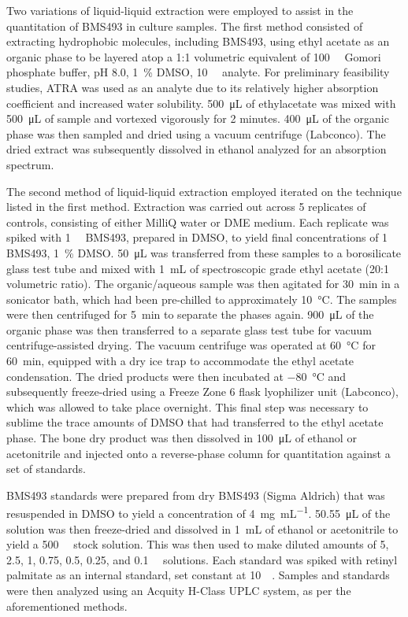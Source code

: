 \begin{refsection}
Two variations of liquid-liquid extraction were employed to assist in the
quantitation of BMS493 in culture samples. The first method consisted of
extracting hydrophobic molecules, including BMS493, using ethyl acetate as an
organic phase to be layered atop a 1:1 volumetric equivalent of
\SI{100}{\milli\moLar} Gomori phosphate buffer, pH 8.0, \SI{1}{\percent} DMSO,
\SI{10}{\micro\moLar} analyte. For preliminary feasibility studies, ATRA was
used as an analyte due to its relatively higher absorption coefficient and
increased water solubility. \SI{500}{\uL} of ethylacetate was mixed with
\SI{500}{\uL} of sample and vortexed vigorously for 2 minutes. \SI{400}{\uL} of
the organic phase was then sampled and dried using a vacuum centrifuge
(Labconco). The dried extract was subsequently dissolved in ethanol analyzed
for an absorption spectrum.

The second method of liquid-liquid extraction employed iterated on the technique
listed in the first method. Extraction was carried out across 5 replicates of
controls, consisting of either MilliQ water or DME medium. Each replicate was
spiked with \SI{1}{\milli\moLar} BMS493, prepared in DMSO, to yield final
concentrations of \SI{1}{\micro\moLar} BMS493, \SI{1}{\percent} DMSO.
\SI{50}{\uL} was transferred from these samples to a borosilicate glass test
tube and mixed with \SI{1}{\mL} of spectroscopic grade ethyl acetate (20:1
volumetric ratio). The organic/aqueous sample was then agitated for
\SI{30}{\minute} in a sonicator bath, which had been pre-chilled to
approximately \SI{10}{\celsius}. The samples were then centrifuged for
\SI{5}{\minute} to separate the phases again. \SI{900}{\uL} of the organic phase
was then transferred to a separate glass test tube for vacuum
centrifuge-assisted drying.  The vacuum centrifuge was operated at
\SI{60}{\celsius} for \SI{60}{\minute}, equipped with a dry ice trap to
accommodate the  ethyl acetate condensation. The dried products were then
incubated at \SI{-80}{\celsius} and subsequently freeze-dried using a Freeze
Zone 6 flask lyophilizer unit (Labconco), which was allowed to take place
overnight. This final step was necessary to sublime the trace amounts of DMSO
that had transferred to the ethyl acetate phase. The bone dry product was then
dissolved in \SI{100}{\uL} of ethanol or acetonitrile and injected onto a
 reverse-phase column for quantitation against a set of standards.

BMS493 standards were prepared from dry BMS493 (Sigma Aldrich) that was
resuspended in DMSO to yield a concentration of \SI{4}{\mg\per\mL}.
\SI{50.55}{\uL} of the solution was then freeze-dried and dissolved in
\SI{1}{\mL} of ethanol or acetonitrile to yield a \SI{500}{\micro\moLar} stock
solution. This was then used to make diluted amounts of 5, 2.5, 1, 0.75, 0.5,
0.25, and \SI{0.1}{\micro\moLar} solutions. Each standard was spiked with retinyl
palmitate as an internal standard, set constant at \SI{10}{\micro\moLar}.
Samples and standards were then analyzed using an Acquity H-Class UPLC system,
as per the aforementioned methods.


\end{refsection}
